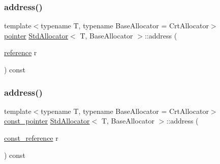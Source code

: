 \subsubsection{\texorpdfstring{address()}{address()}\hspace{0.1cm}{\footnotesize\ttfamily [1/2]}}
{\footnotesize\ttfamily template$<$typename T, typename Base\+Allocator = Crt\+Allocator$>$ \\
\hyperlink{classStdAllocator_a0c970fb2525af736640f0ac3a29d45c5}{pointer} \hyperlink{classStdAllocator}{Std\+Allocator}$<$ T, Base\+Allocator $>$\+::address (\begin{DoxyParamCaption}\item[{\hyperlink{classStdAllocator_a108581b842584639473a6d3fdd135598}{reference}}]{r }\end{DoxyParamCaption}) const\hspace{0.3cm}{\ttfamily [inline]}}

\mbox{\label{classStdAllocator_a56c3bab4003eccf5b7a9d18175ef4dc2}} 
\subsubsection{\texorpdfstring{address()}{address()}\hspace{0.1cm}{\footnotesize\ttfamily [2/2]}}
{\footnotesize\ttfamily template$<$typename T, typename Base\+Allocator = Crt\+Allocator$>$ \\
\hyperlink{classStdAllocator_add1391b3b872c9be9b4d89ed4fabe296}{const\+\_\+pointer} \hyperlink{classStdAllocator}{Std\+Allocator}$<$ T, Base\+Allocator $>$\+::address (\begin{DoxyParamCaption}\item[{\hyperlink{classStdAllocator_a2bc4a28386765e3a2c105b270793a49e}{const\+\_\+reference}}]{r }\end{DoxyParamCaption}) const\hspace{0.3cm}{\ttfamily [inline]}}

\mbox{\label{classStdAllocator_afaabcd7ede5a9432ae8dbe604a0c2982}} 
